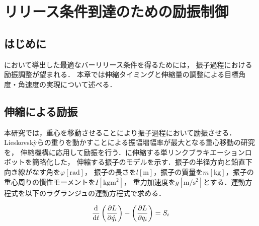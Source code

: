 \chapter[リリース条件到達のための励振制御]%
{リリース条件到達のための励振制御}
        \section{はじめに}

        において導出した最適なバーリリース条件を得るためには，
        振子過程における励振調整が望まれる．
        本章では伸縮タイミングと伸縮量の調整による目標角度・角速度の実現について述べる．
          
        \section{伸縮による励振}

          本研究では，重心を移動させることにより振子過程において励振させる．
          Lieskovsk{\`y}らの重りを動かすことによる振幅増幅率が最大となる重心移動の研究\cite{lieskovsky2023optimal}を，
          伸縮機構に応用して励振を行う．\figref{}に伸縮する単リンクブラキエーションロボットを簡略化した，
          伸縮する振子のモデルを示す．振子の半径方向と鉛直下向き線がなす角を$\varphi [\mathrm{rad}]$，
          振子の長さを$l [\mathrm{m}]$，振子の質量を$m [\mathrm{kg}]$，振子の重心周りの慣性モーメントを$I [\mathrm{kg}\mathrm{m}^2]$，
          重力加速度を$g [\mathrm{m}/\mathrm{s}^2]$とする．運動方程式を以下のラグランジュの運動方程式で求める．

          \begin{eqnarray}
            \equlabel{Lagrange}
            \frac{\mathrm{d}}{\mathrm{d}t}\left(\frac{\partial L}{\partial \dot{q_i}}\right)-\left(\frac{\partial L}{\partial q_i}\right)=S_i
            \end{eqnarray} 
          

